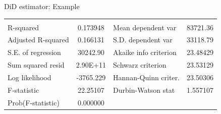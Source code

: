 \documentclass{beamer}
\begin{document}
\begin{frame}{DiD estimator: Example}
\begin{table}[]
\begin{tabular}{lclcc}
                                & \multicolumn{1}{l}{} &                                & \multicolumn{1}{l}{} & \multicolumn{1}{l}{}      \\
R-squared                       & 0.173948             & \multicolumn{2}{l}{Mean dependent var}                & 83721.36                  \\
Adjusted R-squared              & 0.166131             & \multicolumn{2}{l}{S.D. dependent var}                & 33118.79                  \\
S.E. of regression              & 30242.90             & \multicolumn{2}{l}{Akaike info criterion}             & 23.48429                  \\
Sum squared resid               & 2.90E+11             & \multicolumn{2}{l}{Schwarz criterion}                 & 23.53129                  \\
Log likelihood                  & -3765.229            & \multicolumn{2}{l}{Hannan-Quinn criter.}              & 23.50306                  \\
F-statistic                     & 22.25107             & \multicolumn{2}{l}{Durbin-Watson stat}                & 1.557107                  \\
Prob(F-statistic)               & 0.000000             & \multicolumn{2}{l}{}                                  & \multicolumn{1}{l}{}     
\end{tabular}
\end{table}
\end{frame}
\end{document}
